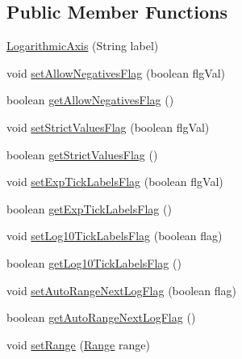 \subsection*{Public Member Functions}
\begin{DoxyCompactItemize}
\item 
\mbox{\hyperlink{classorg_1_1jfree_1_1chart_1_1axis_1_1_logarithmic_axis_ad1f0c2536d888aa21b60bf33b30181c4}{Logarithmic\+Axis}} (String label)
\item 
void \mbox{\hyperlink{classorg_1_1jfree_1_1chart_1_1axis_1_1_logarithmic_axis_a5776406e7ca5526d07b4db53733f984e}{set\+Allow\+Negatives\+Flag}} (boolean flg\+Val)
\item 
boolean \mbox{\hyperlink{classorg_1_1jfree_1_1chart_1_1axis_1_1_logarithmic_axis_acd01e34c2d8c6e5aed52fa37a00d5efd}{get\+Allow\+Negatives\+Flag}} ()
\item 
void \mbox{\hyperlink{classorg_1_1jfree_1_1chart_1_1axis_1_1_logarithmic_axis_a95fb80b856ca657a5424fefc5eb04094}{set\+Strict\+Values\+Flag}} (boolean flg\+Val)
\item 
boolean \mbox{\hyperlink{classorg_1_1jfree_1_1chart_1_1axis_1_1_logarithmic_axis_ae256688d8ed50b3cff30c8a1cb6c167a}{get\+Strict\+Values\+Flag}} ()
\item 
void \mbox{\hyperlink{classorg_1_1jfree_1_1chart_1_1axis_1_1_logarithmic_axis_a6562e919942bb471ade9996b2384c60c}{set\+Exp\+Tick\+Labels\+Flag}} (boolean flg\+Val)
\item 
boolean \mbox{\hyperlink{classorg_1_1jfree_1_1chart_1_1axis_1_1_logarithmic_axis_a19cd5a25466ad4c709c934768d9c41bb}{get\+Exp\+Tick\+Labels\+Flag}} ()
\item 
void \mbox{\hyperlink{classorg_1_1jfree_1_1chart_1_1axis_1_1_logarithmic_axis_a6823066184b31fc84b3a136c22fadcd8}{set\+Log10\+Tick\+Labels\+Flag}} (boolean flag)
\item 
boolean \mbox{\hyperlink{classorg_1_1jfree_1_1chart_1_1axis_1_1_logarithmic_axis_a2368f5441388f88750833c8aabf3b030}{get\+Log10\+Tick\+Labels\+Flag}} ()
\item 
void \mbox{\hyperlink{classorg_1_1jfree_1_1chart_1_1axis_1_1_logarithmic_axis_a5ba0d016e248ba8da551cf62286d87a9}{set\+Auto\+Range\+Next\+Log\+Flag}} (boolean flag)
\item 
boolean \mbox{\hyperlink{classorg_1_1jfree_1_1chart_1_1axis_1_1_logarithmic_axis_a9a34b418d26586425226627f05ced14d}{get\+Auto\+Range\+Next\+Log\+Flag}} ()
\item 
void \mbox{\hyperlink{classorg_1_1jfree_1_1chart_1_1axis_1_1_logarithmic_axis_ab35f30f437f8263a05d62799d957b340}{set\+Range}} (\mbox{\hyperlink{classorg_1_1jfree_1_1data_1_1_range}{Range}} range)

\end{DoxyCompactItemize}
